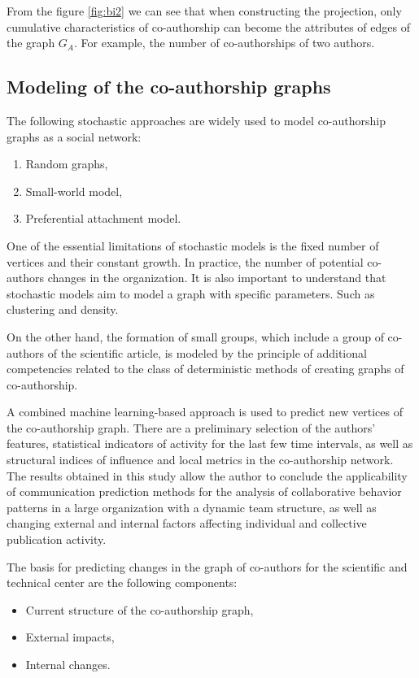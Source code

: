 \documentclass[12pt]{report}
\theoremstyle{definition}
\begin{document}
From the figure \ref{fig:bi2} we can see that when constructing the projection, only cumulative characteristics of co-authorship can become the attributes of edges of the graph $G_A$.
For example, the number of co-authorships of two authors.

\subsection{Modeling of the co-authorship graphs}
The following stochastic approaches are widely used to model co-authorship graphs as a social network: 
\begin{enumerate}
	\item Random graphs,
	\item Small-world model,
	\item Preferential attachment model.
\end{enumerate}

One of the essential limitations of stochastic models is the fixed number of vertices and their constant growth. 
In practice, the number of potential co-authors changes in the organization.
It is also important to understand that stochastic models aim to model a graph with specific parameters. 
Such as clustering and density.

On the other hand, the formation of small groups, which include a group of co-authors of the scientific article, is modeled by the principle of additional competencies related to the class of deterministic methods of creating graphs of co-authorship. 

A combined machine learning-based approach is used to predict new vertices of the co-authorship graph. 
There are a preliminary selection of the authors' features, statistical indicators of activity for the last few time intervals, as well as structural indices of influence and local metrics in the co-authorship network. 
The results obtained in this study allow the author to conclude the applicability of communication prediction methods for the analysis of collaborative behavior patterns in a large organization with a dynamic team structure, as well as changing external and internal factors affecting individual and collective publication activity.

The basis for predicting changes in the graph of co-authors for the scientific and technical center are the following components: 
\begin{itemize}
	\item Current structure of the co-authorship graph,
	\item External impacts,
	\item Internal changes. 
\end{itemize}
\end{document}
